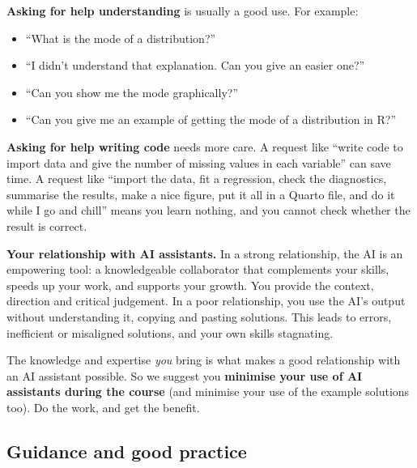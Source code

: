 \documentclass[
  letterpaper,
  8pt,
  a4paper]{book}
\providecommand{\tightlist}{%
  \setlength{\itemsep}{0pt}\setlength{\parskip}{0pt}}
\begin{document}
\textbf{Asking for help understanding} is usually a good use. For
example:

\begin{itemize}
\tightlist
\item
  ``What is the mode of a distribution?''
\item
  ``I didn't understand that explanation. Can you give an easier one?''
\item
  ``Can you show me the mode graphically?''
\item
  ``Can you give me an example of getting the mode of a distribution in
  R?''
\end{itemize}

\textbf{Asking for help writing code} needs more care. A request like
``write code to import data and give the number of missing values in
each variable'' can save time. A request like ``import the data, fit a
regression, check the diagnostics, summarise the results, make a nice
figure, put it all in a Quarto file, and do it while I go and chill''
means you learn nothing, and you cannot check whether the result is
correct.

\textbf{Your relationship with AI assistants.} In a strong relationship,
the AI is an empowering tool: a knowledgeable collaborator that
complements your skills, speeds up your work, and supports your growth.
You provide the context, direction and critical judgement. In a poor
relationship, you use the AI's output without understanding it, copying
and pasting solutions. This leads to errors, inefficient or misaligned
solutions, and your own skills stagnating.

The knowledge and expertise \emph{you} bring is what makes a good
relationship with an AI assistant possible. So we suggest you
\textbf{minimise your use of AI assistants during the course} (and
minimise your use of the example solutions too). Do the work, and get
the benefit.

\subsection*{Guidance and good
practice}\label{guidance-and-good-practice}
\end{document}
